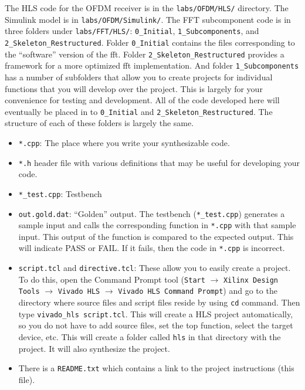 The HLS code for the OFDM receiver is in the \texttt{labs/OFDM/HLS/} directory. The Simulink model is in \texttt{labs/OFDM/Simulink/}. The FFT subcomponent code is in three folders under \texttt{labs/FFT/HLS/}: \texttt{0\_Initial}, \texttt{1\_Subcomponents}, and \texttt{2\_Skeleton\_Restructured}.  Folder \texttt{0\_Initial} contains the files corresponding to the ``software'' version of the \gls{fft}. Folder \texttt{2\_Skeleton\_Restructured} provides a framework for a more optimized \gls{fft} implementation. And folder \texttt{1\_Subcomponents} has a number of subfolders that allow you to create projects for individual functions that you will develop over the project. This is largely for your convenience for testing and development. All of the code developed here will eventually be placed in to \texttt{0\_Initial} and \texttt{2\_Skeleton\_Restructured}.
The structure of each of these folders is largely the same.
\begin{itemize}
\item \texttt{*.cpp}: The place where you write your synthesizable code.
\item \texttt{*.h} header file with various definitions that may be useful for developing your code.
\item \texttt{*\_test.cpp}: Testbench
\item \texttt{out.gold.dat}: ``Golden'' output. The testbench (\texttt{*\_test.cpp}) generates a sample input and calls the corresponding function in \texttt{*.cpp} with that sample input. This output of the function is compared to the expected output. This will indicate PASS or FAIL. If it fails, then the code in \texttt{*.cpp} is incorrect.
\item \texttt{script.tcl} and \texttt{directive.tcl}: These allow you to easily create a project. To do this, open the \VHLS Command Prompt tool (\texttt{Start} $\rightarrow$ \texttt{Xilinx Design Tools} $\rightarrow$ \texttt{Vivado HLS} $\rightarrow$ \texttt{Vivado HLS Command Prompt}) and go to the directory where source files and script files reside by using \texttt{cd} command. Then type \texttt{vivado\_hls script.tcl}. This will create a HLS project automatically, so you do not have to add source files, set the top function, select the target device, etc. This will create a folder called \texttt{hls} in that directory with the project. It will also synthesize the project.
\item There is a \texttt{README.txt} which contains a link to the project instructions (this file). 
\end{itemize}

